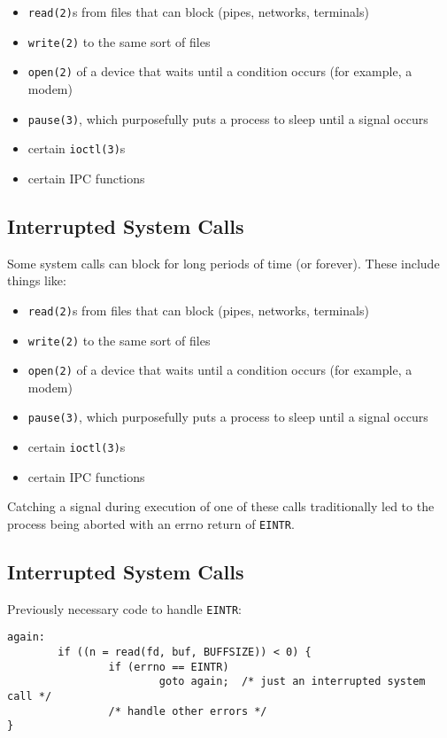 \documentclass[xga]{xdvislides}
\begin{document}
\begin{itemize}
	\item {\tt read(2)}s from files that can block (pipes, networks, terminals)
	\item {\tt write(2)} to the same sort of files
	\item {\tt open(2)} of a device that waits until a condition occurs (for example, a modem)
	\item {\tt pause(3)}, which purposefully puts a process to sleep until a signal occurs
	\item certain {\tt ioctl(3)}s
	\item certain IPC functions
\end{itemize}


\subsection{Interrupted System Calls}

Some system calls can block for long periods of time (or forever). These
include things like:

\begin{itemize}
	\item {\tt read(2)}s from files that can block (pipes, networks, terminals)
	\item {\tt write(2)} to the same sort of files
	\item {\tt open(2)} of a device that waits until a condition occurs (for example, a modem)
	\item {\tt pause(3)}, which purposefully puts a process to sleep until a signal occurs
	\item certain {\tt ioctl(3)}s
	\item certain IPC functions
\end{itemize}

Catching a signal during execution of one of these calls traditionally led
to the process being aborted with an errno return of {\tt EINTR}.


\subsection{Interrupted System Calls}
Previously necessary code to handle {\tt EINTR}:
\begin{verbatim}
again:
        if ((n = read(fd, buf, BUFFSIZE)) < 0) {
                if (errno == EINTR)
                        goto again;  /* just an interrupted system call */
                /* handle other errors */
}
\end{verbatim}
\end{document}
